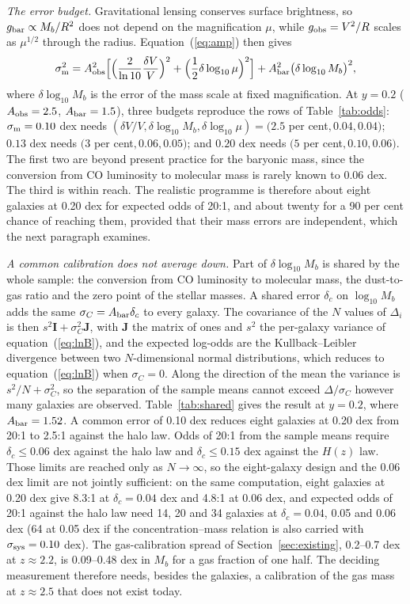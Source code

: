 \documentclass[fleqn,usenatbib]{mnras}
\begin{document}
\emph{The error budget.} Gravitational lensing conserves surface brightness, so $g_{\rm bar}\propto M_b/R^2$ does not depend on the magnification $\mu$, while $g_{\rm obs}=V^2/R$ scales as $\mu^{1/2}$ through the radius. Equation~(\ref{eq:amp}) then gives
\begin{equation}
\sigma_{\rm m}^2=A_{\rm obs}^2\Big[\Big(\frac{2}{\ln10}\frac{\delta V}{V}\Big)^2+\Big(\frac12\delta\log_{10}\mu\Big)^2\Big]+A_{\rm bar}^2\big(\delta\log_{10}M_b\big)^2 ,
\end{equation}
where $\delta\log_{10}M_b$ is the error of the mass scale at fixed magnification. At $y=0.2$ ($A_{\rm obs}=2.5$, $A_{\rm bar}=1.5$), three budgets reproduce the rows of Table~\ref{tab:odds}: $\sigma_{\rm m}=0.10$ dex needs $(\delta V/V,\delta\log_{10}M_b,\delta\log_{10}\mu)=(2.5$ per cent$,0.04,0.04)$; $0.13$ dex needs $(3$ per cent$,0.06,0.05)$; and $0.20$ dex needs $(5$ per cent$,0.10,0.06)$. The first two are beyond present practice for the baryonic mass, since the conversion from CO luminosity to molecular mass is rarely known to 0.06 dex. The third is within reach. The realistic programme is therefore about eight galaxies at 0.20 dex for expected odds of 20:1, and about twenty for a 90 per cent chance of reaching them, provided that their mass errors are independent, which the next paragraph examines.

\emph{A common calibration does not average down.} Part of $\delta\log_{10}M_b$ is shared by the whole sample: the conversion from CO luminosity to molecular mass, the dust-to-gas ratio and the zero point of the stellar masses. A shared error $\delta_c$ on $\log_{10}M_b$ adds the same $\sigma_C=A_{\rm bar}\delta_c$ to every galaxy. The covariance of the $N$ values of $\Delta_i$ is then $s^2\mathbf{I}+\sigma_C^2\mathbf{J}$, with $\mathbf{J}$ the matrix of ones and $s^2$ the per-galaxy variance of equation~(\ref{eq:lnB}), and the expected log-odds are the Kullback--Leibler divergence between two $N$-dimensional normal distributions, which reduces to equation~(\ref{eq:lnB}) when $\sigma_C=0$. Along the direction of the mean the variance is $s^2/N+\sigma_C^2$, so the separation of the sample means cannot exceed $\Delta/\sigma_C$ however many galaxies are observed. Table~\ref{tab:shared} gives the result at $y=0.2$, where $A_{\rm bar}=1.52$. A common error of 0.10 dex reduces eight galaxies at 0.20 dex from 20:1 to 2.5:1 against the halo law. Odds of 20:1 from the sample means require $\delta_c\le0.06$ dex against the halo law and $\delta_c\le0.15$ dex against the $H(z)$ law. Those limits are reached only as $N\to\infty$, so the eight-galaxy design and the 0.06 dex limit are not jointly sufficient: on the same computation, eight galaxies at 0.20 dex give 8.3:1 at $\delta_c=0.04$ dex and 4.8:1 at 0.06 dex, and expected odds of 20:1 against the halo law need 14, 20 and 34 galaxies at $\delta_c=0.04$, 0.05 and 0.06 dex (64 at 0.05 dex if the concentration--mass relation is also carried with $\sigma_{\rm sys}=0.10$ dex). The gas-calibration spread of Section~\ref{sec:existing}, 0.2--0.7 dex at $z\approx2.2$, is 0.09--0.48 dex in $M_b$ for a gas fraction of one half. The deciding measurement therefore needs, besides the galaxies, a calibration of the gas mass at $z\approx2.5$ that does not exist today.
\end{document}
